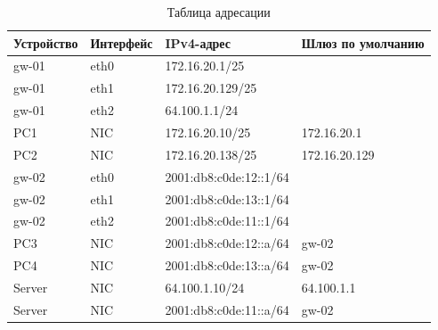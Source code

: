 \begin{table}[]
  \centering
  \caption{Таблица адресации}
  \label{tab1}
\begin{tabular}{|llll|}
\hline
\multicolumn{1}{|l|}{Устройство} & \multicolumn{1}{l|}{Интерфейс} & \multicolumn{1}{l|}{IPv4-адрес} & Шлюз по умолчанию \\ \hline
gw-01                            & eth0                           & 172.16.20.1/25                  &                   \\
gw-01                            & eth1                           & 172.16.20.129/25                &                   \\
gw-01                            & eth2                           & 64.100.1.1/24                   &                   \\ \hline
PC1                              & NIC                            & 172.16.20.10/25                 & 172.16.20.1       \\
PC2                              & NIC                            & 172.16.20.138/25                & 172.16.20.129     \\ \hline
gw-02                            & eth0                           & 2001:db8:c0de:12::1/64          &                   \\
gw-02                            & eth1                           & 2001:db8:c0de:13::1/64          &                   \\
gw-02                            & eth2                           & 2001:db8:c0de:11::1/64          &                   \\ \hline
PC3                              & NIC                            & 2001:db8:c0de:12::a/64          & gw-02             \\
PC4                              & NIC                            & 2001:db8:c0de:13::a/64          & gw-02             \\ \hline
Server                           & NIC                            & 64.100.1.10/24                  & 64.100.1.1        \\
Server                           & NIC                            & 2001:db8:c0de:11::a/64          & gw-02             \\ \hline
\end{tabular}
\end{table}
